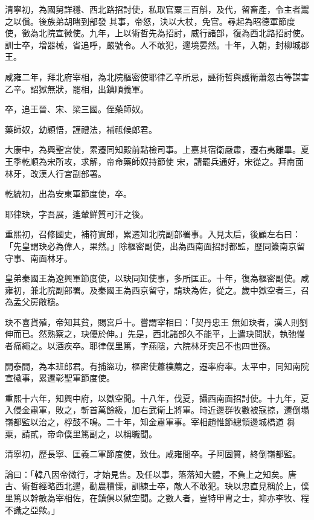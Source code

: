 \begin{pinyinscope}
 清寧初，為國舅詳穩、西北路招討使，私取官粟三百斛，及代，留畜產，令主者鬻之以償。後族弟胡睹到部發
 其事，帝怒，決以大杖，免官。尋起為昭德軍節度使，徵為北院宣徽使。九年，上以術哲先為招討，威行諸部，復為西北路招討使。訓士卒，增器械，省追呼，嚴號令。人不敢犯，邊境晏然。十年，入朝，封柳城郡王。



 咸雍二年，拜北府宰相，為北院樞密使耶律乙辛所忌，誣術哲與護衛蕭忽古等謀害乙辛。詔獄無狀，罷相，出鎮順義軍。



 卒，追王晉、宋、梁三國。侄藥師奴。



 藥師奴，幼穎悟，謹禮法，補祗候郎君。



 大康中，為興聖宮使，累遷同知殿前點檢司事。上嘉其宿衛嚴肅，遷右夷離畢。夏王季乾順為宋所攻，求解，帝命藥師奴持節使
 宋，請罷兵通好，宋從之。拜南面林牙，改漢人行宮副部署。



 乾統初，出為安東軍節度使，卒。



 耶律玦，字吾展，遙輦鮮質可汗之後。



 重熙初，召修國史，補符實郎，累遷知北院副部署事。入見太后，後顧左右曰：「先皇謂玦必為偉人，果然。」除樞密副使，出為西南面招討都監，歷同簽南京留守事、南面林牙。



 皇弟秦國王為遼興軍節度使，以玦同知使事，多所匡正。十年，復為樞密副使。咸雍初，兼北院副部署。及秦國王為西京留守，請玦為佐，從之。歲中獄空者三，召為孟父房敞穩。



 玦不喜貨殖，帝知其貧，賜宮戶十。嘗謂宰相曰：「契丹忠王
 無如玦者，漢人則劉伸而已。然熟察之，玦優於伸。」先是，西北諸部久不能平，上遣玦問狀，執弛慢者痛繩之。以酒疾卒。耶律僕里篤，字燕隱，六院林牙突呂不也四世孫。



 開泰間，為本班郎君。有捕盜功，樞密使蕭樸薦之，遷率府率。太平中，同知南院宣徽事，累遷彰聖軍節度使。



 重熙十六年，知興中府，以獄空聞。十八年，伐夏，攝西南面招討使。十九年，夏入侵金肅軍，敗之，斬首萬餘級，加右武衛上將軍。時近邊群牧數被寇掠，遷倒塌嶺都監以治之，桴鼓不鳴。二十年，知金肅軍事。宰相趙惟節總領邊城橋道
 芻粟，請貳，帝命僕里篤副之，以稱職聞。



 清寧初，歷長寧、匡義二軍節度使，致仕。咸雍間卒。子阿固質，終倒嶺都監。



 論曰：「韓八因帝微行，才始見售。及任以事，落落知大體，不負上之知矣。唐古、術哲經略西北邊，勸農積慄，訓練士卒，敵人不敢犯。玦以忠直見稱於上，僕里篤以幹敏為宰相佐，在鎮俱以獄空聞。之數人者，豈特甲胄之士，抑亦李牧、程不識之亞歟。」



\end{pinyinscope}